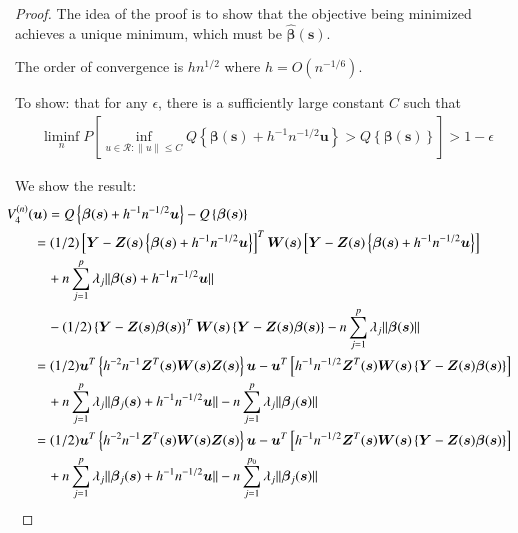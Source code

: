 \documentclass[authoryear, review, 11pt]{elsarticle}
\begin{document}
    \begin{proof}
        The idea of the proof is to show that the objective being minimized achieves a unique minimum, which must be $\hat{\bm{\beta}}(\bm{s})$.
    
        The order of convergence is $h n^{1/2}$ where $h = O(n^{-1/6})$.
    
        To show: that for any $\epsilon$, there is a sufficiently large constant $C$ such that
        \begin{align*}
            \liminf \limits_n P \left[ \inf_{u \in \mathcal{R}: \|u\| \le C} Q \left\{ \bm{\beta}(\bm{s}) + h^{-1} n^{-1/2} \bm{u} \right\} > Q \left\{ \bm{\beta}(\bm{s}) \right\} \right] > 1 - \epsilon
        \end{align*}
    
        We show the result:
        \begin{align}\label{eq:consistency}
            \mkern-18mu V_4^{(n)}(\bm{u}) &= Q \left\{ \bm{\beta} (\bm{s}) + h^{-1} n^{-1/2} \bm{u} \right\} - Q \left\{ \bm{\beta}(\bm{s}) \right\} \notag \\
            &\mkern-18mu= (1/2) \left[ \bm{Y} - \bm{Z}(\bm{s}) \left\{ \bm{\beta}(\bm{s}) + h^{-1} n^{-1/2} \bm{u} \right\} \right]^T \bm{W}(\bm{s}) \left[ \bm{Y} - \bm{Z}(\bm{s}) \left\{ \bm{\beta}(\bm{s}) + h^{-1} n^{-1/2} \bm{u} \right\} \right] \notag \\
            &+ n \sum_{j=1}^p \lambda_j \| \bm{\beta}(\bm{s}) + h^{-1} n^{-1/2} \bm{u} \| \notag \\
            &- (1/2) \left\{ \bm{Y} - \bm{Z}(\bm{s}) \bm{\beta}(\bm{s}) \right\}^T \bm{W}(\bm{s}) \left\{ \bm{Y} - \bm{Z}(\bm{s}) \bm{\beta}(\bm{s}) \right\} - n \sum_{j=1}^p \lambda_j \| \bm{\beta}(\bm{s}) \| \notag \\ 
            &\mkern-18mu= (1/2) \bm{u}^T \left\{ h^{-2} n^{-1} \bm{Z}^T(\bm{s}) \bm{W}(\bm{s}) \bm{Z}(\bm{s}) \right\} \bm{u} - \bm{u}^T \left[ h^{-1} n^{-1/2} \bm{Z}^T(\bm{s}) \bm{W}(\bm{s}) \left\{ \bm{Y} - \bm{Z}(\bm{s}) \bm{\beta}(\bm{s}) \right\} \right] \notag \\
            &+ n \sum_{j=1}^p \lambda_j \|\bm{\beta}_j(\bm{s}) + h^{-1} n^{-1/2} \bm{u} \| - n \sum_{j=1}^p \lambda_j \| \bm{\beta}_j(\bm{s}) \| \notag \\
            &\mkern-18mu= (1/2) \bm{u}^T \left\{ h^{-2} n^{-1} \bm{Z}^T(\bm{s}) \bm{W}(\bm{s}) \bm{Z}(\bm{s}) \right\} \bm{u} - \bm{u}^T \left[ h^{-1} n^{-1/2} \bm{Z}^T(\bm{s}) \bm{W}(\bm{s}) \left\{ \bm{Y} - \bm{Z}(\bm{s}) \bm{\beta}(\bm{s}) \right\} \right] \notag \\
            &+ n \sum_{j=1}^p \lambda_j \|\bm{\beta}_j(\bm{s}) + h^{-1} n^{-1/2} \bm{u} \| - n \sum_{j=1}^{p_0} \lambda_j \| \bm{\beta}_j(\bm{s}) \| \notag \\
        \end{align}
    \end{proof}
\end{document}
